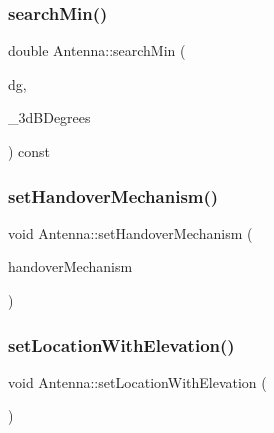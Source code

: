 \mbox{\label{class_antenna_a48ef89b0d1bd313bae4ca863da1cc77e}} 
\subsubsection{\texorpdfstring{search\+Min()}{searchMin()}}
{\footnotesize\ttfamily double Antenna\+::search\+Min (\begin{DoxyParamCaption}\item[{double}]{dg,  }\item[{vector$<$ pair$<$ double, double $>$$>$}]{\+\_\+3d\+B\+Degrees }\end{DoxyParamCaption}) const\hspace{0.3cm}{\ttfamily [private]}}

\mbox{\label{class_antenna_a08ae04778bc036f108762fa9be818332}} 
\subsubsection{\texorpdfstring{set\+Handover\+Mechanism()}{setHandoverMechanism()}}
{\footnotesize\ttfamily void Antenna\+::set\+Handover\+Mechanism (\begin{DoxyParamCaption}\item[{\hyperlink{class_holdable_agent_ae2c334b004d7b9c5a999cf2618e4e518}{Holdable\+Agent\+::\+C\+O\+N\+N\+E\+C\+T\+I\+O\+N\+\_\+\+T\+Y\+PE}}]{handover\+Mechanism }\end{DoxyParamCaption})}

\mbox{\label{class_antenna_a4b1d0ae147826e553a044fd481d6c7e0}} 
\subsubsection{\texorpdfstring{set\+Location\+With\+Elevation()}{setLocationWithElevation()}}
{\footnotesize\ttfamily void Antenna\+::set\+Location\+With\+Elevation (\begin{DoxyParamCaption}{ }\end{DoxyParamCaption})\hspace{0.3cm}{\ttfamily [private]}}

